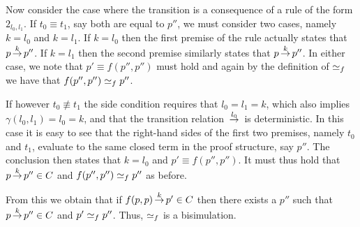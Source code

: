 Now consider the case where the transition is a consequence of a rule of the form $2_{l_0,l_1}$.
If $t_0\equiv t_1$, say both are equal to $p''$, we must consider two cases, namely $k=l_0$ and $k=l_1$.
If $k=l_0$ then the first premise of the rule actually states that $p\,{\stackrel{{k}}{\rightarrow}}\,p''$.
If $k=l_1$ then the second premise similarly states that $p\,{\stackrel{{k}}{\rightarrow}}\,p''$.
In either case, we note that $p'\equiv f(p'',p'')$ must hold and again by the definition of $\mathrel{\simeq_f}$ we have
that $f(p'',p'')\mathrel{\simeq_f} p''$.

If however $t_0\not\equiv t_1$ the side condition requires that $l_0=l_1 = k$, which also implies $\gamma(l_0,l_1)=l_0=k$,
and that the transition relation $\,{\stackrel{{l_0}}{\rightarrow}}\,$ is deterministic.
In this case it is easy to see that the right-hand sides of the first two premises, namely $t_0$ and $t_1$, evaluate to
the same closed term in the proof structure, say $p''$.
The conclusion then states that $k=l_0$ and $p'\equiv f(p'',p'')$.
It must thus hold that $p\,{\stackrel{{k}}{\rightarrow}}\,p''\in C$ and $f(p'',p'')\mathrel{\simeq_f} p''$ as before.

From this we obtain that if $f(p,p) \,{\stackrel{{k}}{\rightarrow}}\, p' \in C$ then there exists
a $p''$ such that $p \,{\stackrel{{k}}{\rightarrow}}\, p'' \in C$ and $p' \mathrel{\simeq_f} p''$.
Thus, $\mathrel{\simeq_f}$ is a bisimulation.